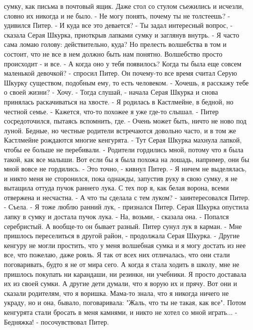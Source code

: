 сумку, как письма в почтовый ящик. Даже стол со стулом съежились и 
исчезли, словно их никогда и не было.
    - Не могу понять, почему ты не толстеешь? - удивился Питер. - И 
куда все это девается?
    - Ты задал интересный вопрос, - сказала Серая Шкурка, приоткрыв 
лапками сумку и заглянув внутрь. - Я часто сама ломаю голову: 
действительно, куда? Но прелесть волшебства в том и состоит, что не 
все в нем должно быть нам понятно. Волшебство просто происходит - и 
все.
    - А когда оно у тебя появилось? Когда ты была еще совсем маленькой 
девочкой? - спросил Питер. Он почему-то все время считал Серую Шкурку 
существом, подобным ему, то есть человеком.
    - Хочешь, я расскажу тебе о своей жизни?
    - Хочу.
    - Тогда слушай, - начала Серая Шкурка и снова принялась 
раскачиваться на хвосте. - Я родилась в Кастлмейне, в бедной, но 
честной семье.
    - Кажется, что-то похожее я уже где-то слышал. - Питер 
сосредоточился, пытаясь вспомнить, где.
    - Очень может быть, ничто не ново под луной. Бедные, но честные 
родители встречаются довольно часто, и в том же Кастлмейне рождаются 
многие кенгурята. - Тут Серая Шкурка махнула лапкой, чтобы ее больше 
не перебивали.
    - Родители гордились мной, потому что я была такой, как все 
малыши. Вот если бы я была похожа на лошадь, например, они бы мной 
вовсе не гордились.
    - Это точно, - кивнул Питер.
    - Я ничем не выделялась, и никто меня не сторонился, пока однажды, 
запустив руку в свою сумку, я не вытащила оттуда пучок раннего лука. С 
тех пор я, как белая ворона, всеми отвержена и несчастна.
    - А что ты сделала с тем луком? - заинтересовался Питер.
    - Съела.
    - Я тоже люблю ранний лук, - признался Питер.
    Серая Шкурка опустила лапку в сумку и достала пучок лука.
    - На, возьми, - сказала она. - Попался серебристый. А вообще-то он 
бывает разный.
    Питер сунул лук в карман.
    - Мне пришлось переселиться в другой район, - продолжала Серая 
Шкурка. - Другие кенгуру не могли простить, что у меня волшебная сумка 
и я могу достать из нее все, что пожелаю, даже рояль. Я так от всех 
них отличалась, что они стали поговаривать, будто я не от мира сего. А 
когда я стала ходить в школу, мне не пришлось покупать ни карандаши, 
ни резинки, ни учебники. Я просто доставала их из своей сумки. А 
другие дети думали, что я ворую их и прячу. Вот они и сказали 
родителям, что я воришка. Мама-то знала, что я никогда ничего не 
украду, но и она, бывало, поговаривала: "Жаль, что ты не такая, как 
все". Потом кенгурята стали бросать в меня камнями, и никто не хотел 
со мной играть...
    - Бедняжка! - посочувствовал Питер.
